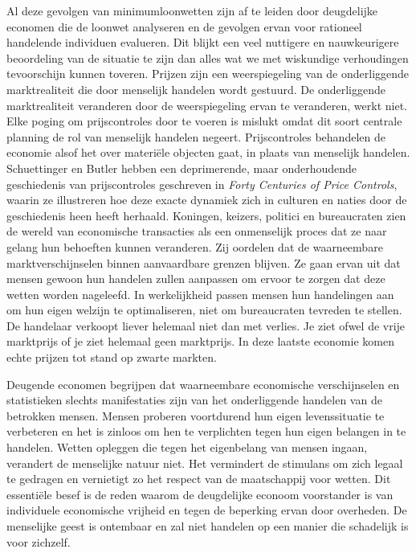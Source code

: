Al deze gevolgen van minimumloonwetten zijn af te leiden door deugdelijke economen die de loonwet analyseren en de gevolgen ervan voor rationeel handelende individuen evalueren. Dit blijkt een veel nuttigere en nauwkeurigere beoordeling van de situatie te zijn dan alles wat we met wiskundige verhoudingen tevoorschijn kunnen toveren. Prijzen zijn een weerspiegeling van de onderliggende marktrealiteit die door menselijk handelen wordt gestuurd. De onderliggende marktrealiteit veranderen door de weerspiegeling ervan te veranderen, werkt niet. Elke poging om prijscontroles door te voeren is mislukt omdat dit soort centrale planning de rol van menselijk handelen negeert. Prijscontroles behandelen de economie alsof het over materiële objecten gaat, in plaats van menselijk handelen. Schuettinger en Butler hebben een deprimerende, maar onderhoudende geschiedenis van prijscontroles geschreven in \textit{Forty Centuries of Price Controls}, waarin ze illustreren hoe deze exacte dynamiek zich in culturen en naties door de geschiedenis heen heeft herhaald.\autocite{12} Koningen, keizers, politici en bureaucraten zien de wereld van economische transacties als een onmenselijk proces dat ze naar gelang hun behoeften kunnen veranderen. Zij oordelen dat de waarneembare marktverschijnselen binnen aanvaardbare grenzen blijven. Ze gaan ervan uit dat mensen gewoon hun handelen zullen aanpassen om ervoor te zorgen dat deze wetten worden nageleefd. In werkelijkheid passen mensen hun handelingen aan om hun eigen welzijn te optimaliseren, niet om bureaucraten tevreden te stellen. De handelaar verkoopt liever helemaal niet dan met verlies. Je ziet ofwel de vrije marktprijs of je ziet helemaal geen marktprijs. In deze laatste economie komen echte prijzen tot stand op zwarte markten.

Deugende economen begrijpen dat waarneembare economische verschijnselen en statistieken slechts manifestaties zijn van het onderliggende handelen van de betrokken mensen. Mensen proberen voortdurend hun eigen levenssituatie te verbeteren en het is zinloos om hen te verplichten tegen hun eigen belangen in te handelen. Wetten opleggen die tegen het eigenbelang van mensen ingaan, verandert de menselijke natuur niet. Het vermindert de stimulans om zich legaal te gedragen en vernietigt zo het respect van de maatschappij voor wetten. Dit essentiële besef is de reden waarom de deugdelijke econoom voorstander is van individuele economische vrijheid en tegen de beperking ervan door overheden. De menselijke geest is ontembaar en zal niet handelen op een manier die schadelijk is voor zichzelf.


